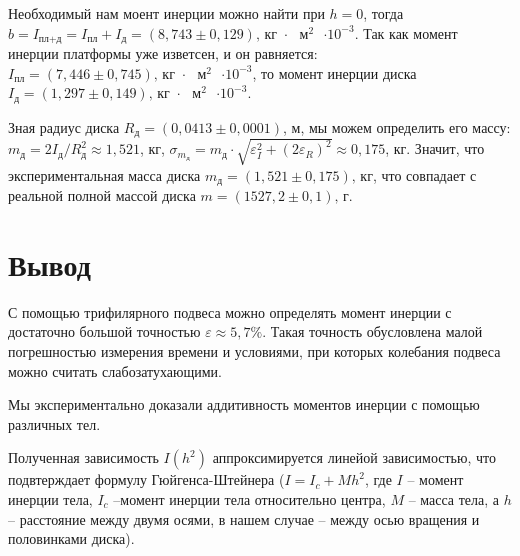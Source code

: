 	Необходимый нам моент инерции можно найти при $h = 0$, тогда $b = I_\text{пл+д} = I_\text{пл} + I_\text{д} = \left(8,743 \pm 0,129\right) \text{,  кг $\cdot$ $\text{м}^2$ $\cdot 10^{-3}$}$. Так как момент инерции платформы уже изветсен, и он равняется: $I_\text{пл} = \left(7,446 \pm 0,745\right) \text{,  кг $\cdot$ $\text{м}^2$ $\cdot 10^{-3}$}$, то момент инерции диска \underline{$I_\text{д} = \left(1,297 \pm 0,149\right) \text{,  кг $\cdot$ $\text{м}^2$ $\cdot 10^{-3}$}$}.
	
	Зная радиус диска $R_\text{д} = (0,0413 \pm 0,0001)$, м, мы можем определить его массу: $m_\text{д} = 2I_\text{д}/R_\text{д}^2 \approx 1,521$, кг, $\sigma_{m_\text{д}} = m_\text{д} \cdot \sqrt{\varepsilon_I^2+\left(2\varepsilon_R\right)^2} \approx  0,175$, кг. Значит, что экспериментальная масса диска \underline{$m_\text{д} = \left(1,521 \pm 0,175 \right)\text{, кг}$}, что совпадает с реальной полной массой диска $m = (1527,2 \pm 0,1)\text{, г}$. 
	
	\section{Вывод}
	
	С помощью трифилярного подвеса можно определять момент инерции с достаточно большой точностью $\varepsilon \approx 5,7\%$. Такая точность обусловлена малой погрешностью измерения времени и условиями, при которых колебания подвеса можно считать слабозатухающими.
	
	Мы экспериментально доказали аддитивность моментов инерции с помощью различных тел.
	
	Полученная зависимость $I(h^2)$ аппроксимируется линейой зависимостью, что подвтерждает формулу Гюйгенса-Штейнера ($I = I_c + Mh^2$, где $I$ -- момент инерции тела, $I_c$ --момент инерции тела относительно центра, $M$ -- масса тела, а $h$ -- расстояние между двумя осями, в нашем случае -- между осью вращения и половинками диска).
	
	
